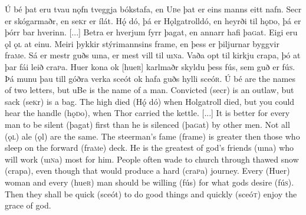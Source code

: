 \begin{paracol}{2}
    Ú bé þat eru tvau nǫfn tveggja bókstafa, en U\textsc{b}e þat er eins manns eitt nafn. Secr er skógarmaðr, en se\textsc{k}r er ílát. Hǫ́ dó, þá er Hǫlgatroll\footnotemark dó, en heyrði til hǫ\textsc{d}o, þá er þórr bar hverinn. [...] Betra er hverjum fyrr þagat, en annarr hafi þa\textsc{g}at. Eigi eru ǫl ǫ\textsc{l} at einu. Meiri þykkir stýrimannsins frame, en þess er þiljurnar byggvir fra\textsc{m}e. Sá er mestr guðs uına, er mest vill til uı\textsc{n}a. Vaða opt til kirkju crapa, þó at þar fái leið cra\textsc{p}a. Huer kona ok [hue\textsc{r}] karlmaðr skyldu þess fús, sem guð er fú\textsc{s}. Þá munu þau till góðra verka sceót ok hafa guðs hylli sceó\textsc{r}.
    \switchcolumn
    Ú bé are the names of two letters, but uBe is the name of a man. Convicted (secr) is an outlaw, but sack (se\textsc{k}r) is a bag. The high died (Hǫ́ dó) when Holgatroll died, but you could hear the handle (hǫ\textsc{d}o), when Thor carried the kettle. [...] It is better for every man to be silent (þagat) first than he is silenced (þa\textsc{g}at) by other men. Not all (ǫ\textsc{l}) ale (ǫl) are the same. The steerman's fame (frame) is greater then those who sleep on the forward (fra\textsc{m}e) deck. He is the greatest of god's friends (uına) who will work (uı\textsc{n}a) most for him. People often wade to church through thawed snow (crapa), even though that would produce a hard (cra\textsc{p}a) journey. Every (Huer) woman and every (hue\textsc{r}) man should be willing (fús) for what gods desire (fú\textsc{s}). Then they shall be quick (sceót) to do good things and quickly (sceó\textsc{t}) enjoy the grace of god.
\end{paracol}
